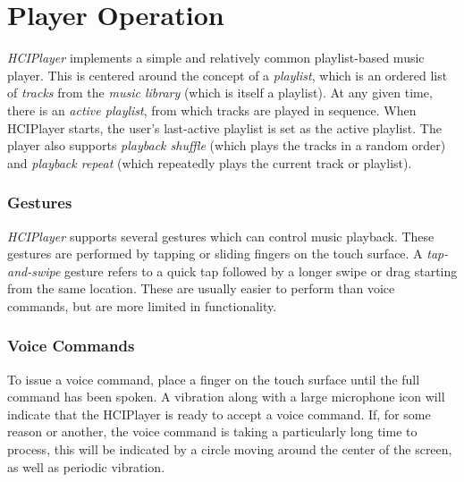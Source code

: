 \documentclass[12pt,letterpaper]{article}
\begin{document}
\section{Player Operation}

\emph{HCIPlayer} implements a simple and relatively common playlist-based music player. This is centered around the concept of a \emph{playlist}, which is an ordered list of \emph{tracks} from the \emph{music library} (which is itself a playlist). At any given time, there is an \emph{active playlist}, from which tracks are played in sequence. When HCIPlayer starts, the user's last-active playlist is set as the active playlist. The player also supports \emph{playback shuffle} (which plays the tracks in a random order) and \emph{playback repeat} (which repeatedly plays the current track or playlist).


\subsubsection*{Gestures}
\emph{HCIPlayer} supports several gestures which can control music playback. These gestures are performed by tapping or sliding fingers on the touch surface. A \emph{tap-and-swipe} gesture refers to a quick tap followed by a longer swipe or drag starting from the same location. These are usually easier to perform than voice commands, but are more limited in functionality.

\subsubsection*{Voice Commands}
To issue a voice command, place a finger on the touch surface until the full command has been spoken. A vibration {\color{blue} along with a large microphone icon} will indicate that the HCIPlayer is ready to accept a voice command. If, for some reason or another, the voice command is taking a particularly long time to process, {\color{magenta}this will be indicated by a circle moving around the center of the screen}, as well as periodic vibration.
\end{document}
